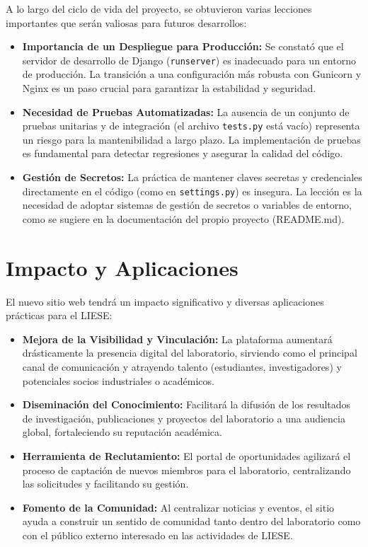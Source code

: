 A lo largo del ciclo de vida del proyecto, se obtuvieron varias lecciones importantes que serán valiosas para futuros desarrollos:
\begin{itemize}
    \item \textbf{Importancia de un Despliegue para Producción:} Se constató que el servidor de desarrollo de Django (\texttt{runserver}) es inadecuado para un entorno de producción. La transición a una configuración más robusta con Gunicorn y Nginx es un paso crucial para garantizar la estabilidad y seguridad.
    \item \textbf{Necesidad de Pruebas Automatizadas:} La ausencia de un conjunto de pruebas unitarias y de integración (el archivo \texttt{tests.py} está vacío) representa un riesgo para la mantenibilidad a largo plazo. La implementación de pruebas es fundamental para detectar regresiones y asegurar la calidad del código.
    \item \textbf{Gestión de Secretos:} La práctica de mantener claves secretas y credenciales directamente en el código (como en \texttt{settings.py}) es insegura. La lección es la necesidad de adoptar sistemas de gestión de secretos o variables de entorno, como se sugiere en la documentación del propio proyecto (README.md).
\end{itemize}

\section{Impacto y Aplicaciones}

El nuevo sitio web tendrá un impacto significativo y diversas aplicaciones prácticas para el LIESE:
\begin{itemize}
    \item \textbf{Mejora de la Visibilidad y Vinculación:} La plataforma aumentará drásticamente la presencia digital del laboratorio, sirviendo como el principal canal de comunicación y atrayendo talento (estudiantes, investigadores) y potenciales socios industriales o académicos.
    \item \textbf{Diseminación del Conocimiento:} Facilitará la difusión de los resultados de investigación, publicaciones y proyectos del laboratorio a una audiencia global, fortaleciendo su reputación académica.
    \item \textbf{Herramienta de Reclutamiento:} El portal de oportunidades agilizará el proceso de captación de nuevos miembros para el laboratorio, centralizando las solicitudes y facilitando su gestión.
    \item \textbf{Fomento de la Comunidad:} Al centralizar noticias y eventos, el sitio ayuda a construir un sentido de comunidad tanto dentro del laboratorio como con el público externo interesado en las actividades de LIESE.
\end{itemize}